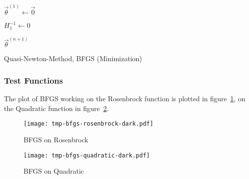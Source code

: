 			\begin{algorithm}
				\(\vec{\theta}^{(1)} \gets \vec{0}\)

				\(H_{1}^{-1} \gets 0\)


				\Return \(\vec{\theta}^{(n + 1)}\)

				\caption{Quasi-Newton-Method, BFGS (Minimization)}
				\label{alg:bfgs}
			\end{algorithm}

			\subsubsection{Test Functions}
				The plot of BFGS working on the Rosenbrock function is plotted in figure~\ref{fig:bfgsExampleRosenbrock}, on the Quadratic function in figure~\ref{fig:bfgsExampleQuadratic}.

				\begin{figure}
					\centering
					\texttt{[image: tmp-bfgs-rosenbrock-dark.pdf]}
					\caption{BFGS on Rosenbrock}
					\label{fig:bfgsExampleRosenbrock}
				\end{figure}
				\begin{figure}
					\centering
					\texttt{[image: tmp-bfgs-quadratic-dark.pdf]}
					\caption{BFGS on Quadratic}
					\label{fig:bfgsExampleQuadratic}
				\end{figure}

